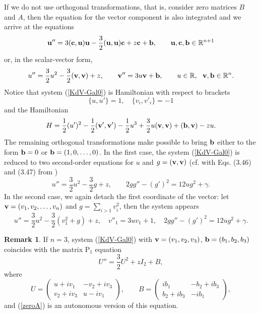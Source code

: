 \documentclass[11pt]{article}
\theoremstyle{plain}
\theoremstyle{definition}
\newtheorem{remark}[proposition]{Remark}
\begin{document}
If we do not use orthogonal transformations, that is, consider zero matrices $B$ and $A$, then the equation for the vector component is also integrated and we arrive at the equations
\begin{equation}\label{KdVc-Gal0}
 {\bf u}''=3({\bf c},{\bf u}){\bf u}-\frac{3}{2}({\bf u},{\bf u}){\bf c}+z{\bf c}+{\bf b},\qquad 
 {\bf u},{\bf c},{\bf b}\in{\mathbb R}^{n+1}
\end{equation}
or, in the scalar-vector form,
\begin{equation}\label{KdV-Gal0}
 u''=\frac{3}{2}u^2-\frac{3}{2}({\bf v},{\bf v})+z,\qquad 
 {\bf v}''=3u{\bf v}+{\bf b},\qquad u\in{\mathbb R},~~ {\bf v},{\bf b}\in{\mathbb R}^n.
\end{equation}
Notice that system (\ref{KdV-Gal0}) is Hamiltonian with respect to brackets
\[
 \{u,u'\}=1,\quad \{v_i,v'_i\}=-1
\]
and the Hamiltonian
\[
 H=\frac{1}{2}(u')^2-\frac{1}{2}({\bf v}',{\bf v}')-\frac{1}{2}u^3
   +\frac{3}{2}u({\bf v},{\bf v})+({\bf b},{\bf v})-zu.
\]
The remaining orthogonal transformations make possible to bring ${\bf b}$ either to the form ${\bf b}=0$ or ${\bf b}=(1,0,\dots,0)$. In the first case, the system (\ref{KdV-Gal0}) is reduced to two second-order equations for $u$ and $g=({\bf v},{\bf v})$ (cf. with Eqs. (3.46) and (3.47) from \cite{Cosgrove_2000a})
\begin{equation}\label{KdV-Gal00}
 u''=\frac{3}{2}u^2-\frac{3}{2}g+z,\qquad 2gg''-(g')^2=12ug^2+\gamma.
\end{equation}
In the second case, we again detach the first coordinate of the vector: let ${\bf v}=(v_1,v_2,\dots,v_n)$ and $g=\sum_{i>1}v^2_i$, then the system appears
\begin{equation}\label{KdV-Gal01}
 u''=\frac{3}{2}u^2-\frac{3}{2}(v^2_1+g)+z,\quad 
 v''_1=3u v_1+1,\quad 
 2gg''-(g')^2=12ug^2+\gamma.
\end{equation}

\begin{remark} If $n=3$, system (\ref{KdV-Gal0}) with  ${\bf v}=(v_1,v_2,v_3)$, ${\bf b}=(b_1,b_2,b_3)$ coincides with the matrix P$_1$ equation \cite{Balandin_Sokolov_1998}
\[
 U''= \frac{3}{2}U^2+zI_2+B, 
\]
where 
\[
 U=\begin{pmatrix}
 u+iv_1 & -v_2+iv_3\\
 v_2+iv_3 & u-iv_1
 \end{pmatrix},\qquad
 B=\begin{pmatrix}
  ib_1 & -b_2+ib_3\\
  b_2+ib_3 & -ib_1
 \end{pmatrix},
\]
and (\ref{zeroA}) is an autonomous version of this equation.

\end{remark}
\end{document}
